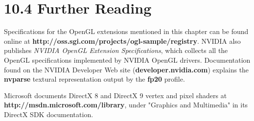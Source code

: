 \documentclass[../main.tex]{subfiles}
\begin{document}
\section{10.4 Further Reading}

Specifications for the OpenGL extensions mentioned in this chapter can be found online at \textbf{http://oss.sgi.com/projects/ogl-sample/registry}. NVIDIA also publishes \textit{NVIDIA OpenGL Extension Specifications}, which collects all the OpenGL specifications implemented by NVIDIA OpenGL drivers. Documentation found on the NVIDIA Developer Web site (\textbf{developer.nvidia.com}) explains the \textbf{nvparse} textural representation output by the \textbf{fp20} profile.

Microsoft documents DirectX 8 and DirectX 9 vertex and pixel shaders at \textbf{http://msdn.microsoft.com/library}, under "Graphics and Multimedia" in its DirectX SDK documentation.
\end{document}
